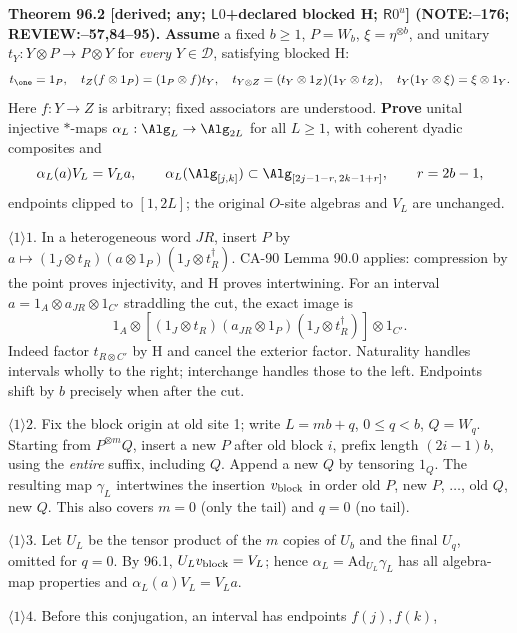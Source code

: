 \textbf{Theorem 96.2 [derived; any; \(\mathsf L0\)+declared blocked H; \(\mathsf R0^u\)] (NOTE:--176; REVIEW:--57,84--95).}
\textbf{Assume} a fixed \(b\ge1\), \(P=W_b\), \(\xi=\eta^{\otimes b}\), and unitary
\(t_Y:Y\otimes P\to P\otimes Y\) for \emph{every} \(Y\in\mathcal D\), satisfying blocked H:
\[
 t_\one=1_P,\quad t_Z(f\otimes1_P)=(1_P\otimes f)t_Y,\quad
 t_{Y\otimes Z}=(t_Y\otimes1_Z)(1_Y\otimes t_Z),\quad t_Y(1_Y\otimes\xi)=\xi\otimes1_Y.
\]
Here \(f:Y\to Z\) is arbitrary; fixed associators are understood. \textbf{Prove} unital injective \(*\)-maps
\(\alpha_L:\Alg_L\to\Alg_{2L}\) for all \(L\ge1\), with coherent dyadic composites and
\begin{equation}\label{eq:96-lift}
 \alpha_L(a)V_L=V_La,\qquad
 \alpha_L(\Alg_{[j,k]})\subset\Alg_{[2j-1-r,\,2k-1+r]},\qquad r=2b-1,
\end{equation}
endpoints clipped to \([1,2L]\); the original \(O\)-site algebras and \(V_L\) are unchanged.
\par\(\langle1\rangle1\). In a heterogeneous word \(JR\), insert \(P\) by
\(a\mapsto(1_J\otimes t_R)(a\otimes1_P)(1_J\otimes t_R^\dagger)\).
CA-90 Lemma 90.0 applies: compression by the point proves injectivity, and H proves intertwining.
For an interval \(a=1_A\otimes a_{JR}\otimes1_{C'}\) straddling the cut, the exact image is
\[
 1_A\otimes[(1_J\otimes t_R)(a_{JR}\otimes1_P)(1_J\otimes t_R^\dagger)]\otimes1_{C'}.
\]
Indeed factor \(t_{R\otimes C'}\) by H and cancel the exterior factor. Naturality handles intervals wholly to
the right; interchange handles those to the left. Endpoints shift by \(b\) precisely when after the cut.
\par\(\langle1\rangle2\). Fix the block origin at old site 1; write \(L=mb+q\), \(0\le q<b\), \(Q=W_q\).
Starting from \(P^{\otimes m}Q\), insert a new \(P\) after old block \(i\), prefix length \((2i-1)b\),
using the \emph{entire} suffix, including \(Q\). Append a new \(Q\) by tensoring \(1_Q\). The resulting map
\(\gamma_L\) intertwines the insertion \(v_{\rm block}\) in order old \(P\), new \(P\), \(\ldots\), old \(Q\), new \(Q\).
This also covers \(m=0\) (only the tail) and \(q=0\) (no tail).
\par\(\langle1\rangle3\). Let \(U_L\) be the tensor product of the \(m\) copies of \(U_b\) and the final \(U_q\),
omitted for \(q=0\). By 96.1, \(U_Lv_{\rm block}=V_L\); hence \(\alpha_L=\mathrm{Ad}_{U_L}\gamma_L\) has all algebra-map
properties and \(\alpha_L(a)V_L=V_La\).
\par\(\langle1\rangle4\). Before this conjugation, an interval has endpoints \(f(j),f(k)\),
